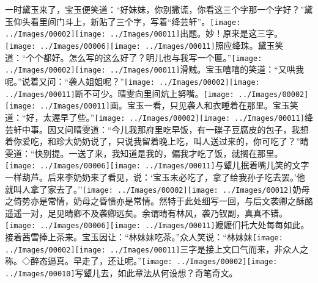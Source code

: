 一时黛玉来了，宝玉便笑道：``好妹妹，你别撒谎，你看这三个字那一个字好？''黛玉仰头看里间门斗上，新贴了三个字，写着``绛芸轩''。{{\texttt{[image: ../Images/00002]}\texttt{[image: ../Images/00011]}\footnotesize \kaishu 出题。妙！原来是这三字。　}\texttt{[image: ../Images/00006]}\texttt{[image: ../Images/00011]}\footnotesize \kaishu 照应绛珠。}黛玉笑道：``个个都好。怎么写的这么好了？明儿也与我写一个匾。''{\texttt{[image: ../Images/00002]}\texttt{[image: ../Images/00011]}\footnotesize \kaishu 滑贼。}宝玉嘻嘻的笑道：``又哄我呢。''说着又问：``袭人姐姐呢？''{\texttt{[image: ../Images/00002]}\texttt{[image: ../Images/00011]}\footnotesize \kaishu 断不可少。}晴雯向里间炕上努嘴。{\texttt{[image: ../Images/00002]}\texttt{[image: ../Images/00011]}\footnotesize \kaishu 画。}宝玉一看，只见袭人和衣睡着在那里。宝玉笑道：``好，太渥早了些。''{\texttt{[image: ../Images/00002]}\texttt{[image: ../Images/00011]}\footnotesize \kaishu 绛芸轩中事。}因又问晴雯道：``今儿我那府里吃早饭，有一碟子豆腐皮的包子，我想着你爱吃，和珍大奶奶说了，只说我留着晚上吃，叫人送过来的，你可吃了？''晴雯道：``快别提。一送了来，我知道是我的，偏我才吃了饭，就搁在那里。{\texttt{[image: ../Images/00006]}\texttt{[image: ../Images/00011]}\footnotesize \kaishu 与颦儿抿着嘴儿笑的文字一样葫芦。}后来李奶奶来了看见，说：`宝玉未必吃了，拿了给我孙子吃去罢。'他就叫人拿了家去了。''{{\texttt{[image: ../Images/00002]}\texttt{[image: ../Images/00012]}\footnotesize \kaishu 奶母之倚势亦是常情，奶母之昏愦亦是常情。然特于此处细写一回，与后文袭卿之酥酪遥遥一对，足见晴卿不及袭卿远矣。余谓晴有林风，袭乃钗副，真真不错。　}\texttt{[image: ../Images/00006]}\texttt{[image: ../Images/00011]}\footnotesize \kaishu 嬷嬷们托大处每每如此。}接着茜雪捧上茶来。宝玉因让：``林妹妹吃茶。''众人笑说：``林妹妹{\texttt{[image: ../Images/00002]}\texttt{[image: ../Images/00011]}\footnotesize \kaishu 三字是接上文口气而来，非众人之称。◇醉态逼真。}早走了，还让呢。''{\texttt{[image: ../Images/00002]}\texttt{[image: ../Images/00010]}\footnotesize \kaishu 写颦儿去，如此章法从何设想？奇笔奇文。}

